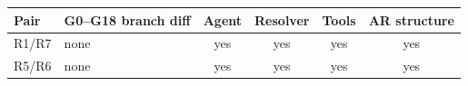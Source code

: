 \begin{tabularx}{\linewidth}{@{}l l c c c c@{}}
\toprule
Pair & G0--G18 branch diff & Agent & Resolver & Tools & AR structure \\
\midrule
R1/R7 & none & yes & yes & yes & yes \\
R5/R6 & none & yes & yes & yes & yes \\
\bottomrule
\end{tabularx}
